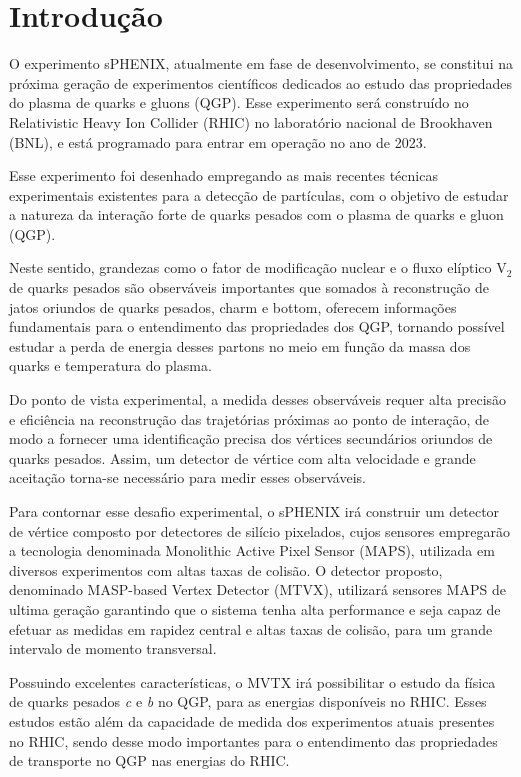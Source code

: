 \chapter{Introdução}

O experimento sPHENIX, atualmente em fase de desenvolvimento, se constitui na próxima geração de experimentos científicos dedicados ao estudo das propriedades do plasma de quarks e gluons (QGP). Esse experimento será construído no Relativistic Heavy Ion Collider (RHIC) no laboratório nacional de Brookhaven (BNL), e está programado para entrar em operação no ano de 2023.

Esse experimento foi desenhado empregando as mais recentes técnicas experimentais existentes para a detecção de partículas, com o objetivo de estudar a natureza da interação forte de quarks pesados com o plasma de quarks e gluon (QGP). 

Neste sentido, grandezas como o fator de modificação nuclear e o fluxo elíptico V$_{2}$ de quarks pesados são observáveis importantes que somados à reconstrução de jatos oriundos de quarks pesados, charm e bottom, oferecem informações fundamentais para o entendimento das propriedades dos QGP, tornando possível estudar a perda de energia desses partons no meio em função da massa dos quarks e temperatura do plasma.

Do ponto de vista experimental, a medida desses observáveis requer alta precisão e eficiência na reconstrução das trajetórias próximas ao ponto de interação, de modo a fornecer uma identificação precisa dos vértices secundários oriundos de quarks pesados. Assim, um detector de vértice com alta velocidade e grande aceitação torna-se necessário para medir esses observáveis.  

Para contornar esse desafio experimental, o sPHENIX irá construir um detector de vértice composto por detectores de silício pixelados, cujos sensores empregarão a tecnologia denominada Monolithic Active Pixel Sensor (MAPS), utilizada em diversos experimentos com altas taxas de colisão. O detector proposto, denominado MASP-based Vertex Detector (MTVX), utilizará sensores MAPS de ultima geração garantindo que o sistema tenha alta performance e seja capaz de efetuar as medidas em rapidez central e altas taxas de colisão, para um grande intervalo de momento transversal.

Possuindo excelentes características, o MVTX irá possibilitar o estudo da física de quarks pesados \textit{c} e \textit{b} no QGP, para as energias disponíveis no RHIC. Esses estudos estão além da capacidade de medida dos experimentos atuais presentes no RHIC, sendo desse modo importantes para o entendimento das propriedades de transporte no QGP nas energias do RHIC.

